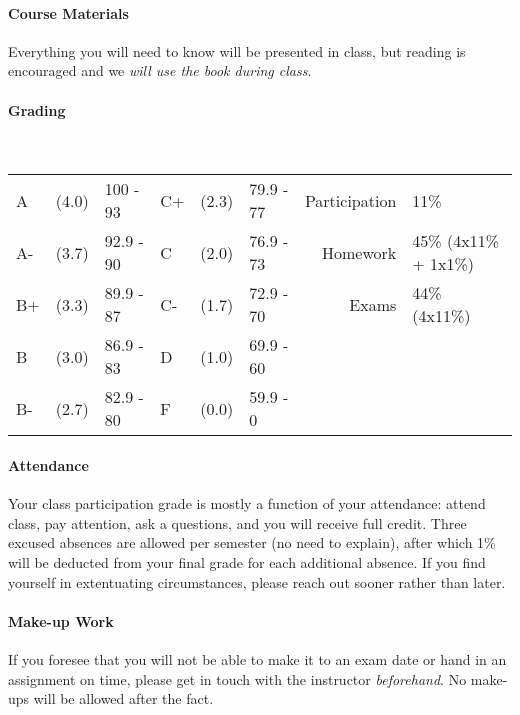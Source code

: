 \documentclass{article}
\begin{document}
  \paragraph{Course Materials}
    Everything you will need to know will be presented in class, but reading is encouraged and we \emph{will use the book during class}.

  \paragraph{Grading} \mbox{}\\
    {\small
      \begin{tabular}{@{} l @{} l l l @{} l l | r l @{}}
        A   & (4.0) & 100 - 93  & C+  & (2.3) & 79.9 - 77 & Participation & 11\%\\
        A-  & (3.7) & 92.9 - 90 & C   & (2.0) & 76.9 - 73 & Homework      & 45\% (4x11\% + 1x1\%)\\
        B+  & (3.3) & 89.9 - 87 & C-  & (1.7) & 72.9 - 70 & Exams         & 44\% (4x11\%)\\
        B   & (3.0) & 86.9 - 83 & D   & (1.0) & 69.9 - 60 & \\
        B-  & (2.7) & 82.9 - 80 & F   & (0.0) & 59.9 - 0  & \\
      \end{tabular}
    }

  \paragraph{Attendance}
    Your class participation grade is mostly a function of your attendance: attend class, pay attention, ask a questions, and you will receive full credit. Three excused absences are allowed per semester (no need to explain), after which 1\% will be deducted from your final grade for each additional absence. If you find yourself in extentuating circumstances, please reach out sooner rather than later.

  \paragraph{Make-up Work}
    If you foresee that you will not be able to make it to an exam date or hand in an assignment on time, please get in touch with the instructor \emph{beforehand}. No make-ups will be allowed after the fact.
\end{document}
